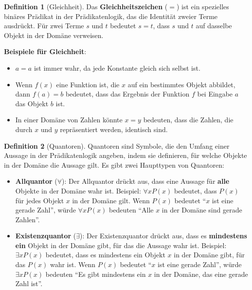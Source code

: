 \documentclass{book}
\theoremstyle{plain}
\theoremstyle{remark}
\theoremstyle{definition}
\newtheorem{definition}{Definition}[section]
\begin{document}
\begin{definition}[Gleichheit]
Das \textbf{Gleichheitszeichen} (\(=\)) ist ein spezielles binäres Prädikat in der Prädikatenlogik, das die Identität zweier Terme ausdrückt. Für zwei Terme \(s\) und \(t\) bedeutet \(s = t\), dass \(s\) und \(t\) auf dasselbe Objekt in der Domäne verweisen.

\textbf{Beispiele für Gleichheit}:
\begin{itemize}
    \item \(a = a\) ist immer wahr, da jede Konstante gleich sich selbst ist.
    \item Wenn \(f(x)\) eine Funktion ist, die \(x\) auf ein bestimmtes Objekt abbildet, dann \(f(a) = b\) bedeutet, dass das Ergebnis der Funktion \(f\) bei Eingabe \(a\) das Objekt \(b\) ist.
    \item In einer Domäne von Zahlen könnte \(x = y\) bedeuten, dass die Zahlen, die durch \(x\) und \(y\) repräsentiert werden, identisch sind.
\end{itemize}
\end{definition}


\begin{definition}[Quantoren]
Quantoren sind Symbole, die den Umfang einer Aussage in der Prädikatenlogik angeben, indem sie definieren, für welche Objekte in der Domäne die Aussage gilt. Es gibt zwei Haupttypen von Quantoren:

\begin{itemize}
    \item \textbf{Allquantor} (\(\forall\)): Der Allquantor drückt aus, dass eine Aussage für \textbf{alle} Objekte in der Domäne wahr ist. Beispiel: \(\forall x P(x)\) bedeutet, dass \(P(x)\) für jedes Objekt \(x\) in der Domäne gilt. Wenn \(P(x)\) bedeutet \enquote{\(x\) ist eine gerade Zahl}, würde \(\forall x P(x)\) bedeuten \enquote{Alle \(x\) in der Domäne sind gerade Zahlen}.
    
    \item \textbf{Existenzquantor} (\(\exists\)): Der Existenzquantor drückt aus, dass es \textbf{mindestens ein} Objekt in der Domäne gibt, für das die Aussage wahr ist. Beispiel: \(\exists x P(x)\) bedeutet, dass es mindestens ein Objekt \(x\) in der Domäne gibt, für das \(P(x)\) wahr ist. Wenn \(P(x)\) bedeutet \enquote{\(x\) ist eine gerade Zahl}, würde \(\exists x P(x)\) bedeuten \enquote{Es gibt mindestens ein \(x\) in der Domäne, das eine gerade Zahl ist}.
\end{itemize}
\end{definition}
\end{document}
